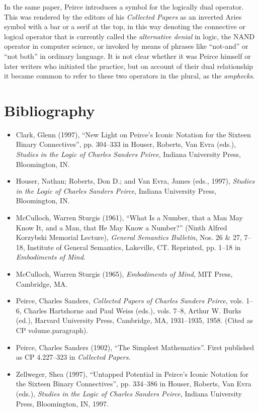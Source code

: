 \documentclass[12pt]{article}
\begin{document}
In the same paper, Peirce introduces a symbol for the logically dual operator.  This was rendered by the editors of his \textit{Collected Papers} as an inverted Aries symbol with a bar or a serif at the top, in this way denoting the connective or logical operator that is currently called the \textit{alternative denial} in logic, the NAND operator in computer science, or invoked by means of phrases like ``not-and'' or ``not both'' in ordinary language.  It is not clear whether it was Peirce himself or later writers who initiated the practice, but on account of their dual relationship it became common to refer to these two operators in the plural, as the \textit{amphecks}.

\section{Bibliography}

\begin{itemize}
\item
Clark, Glenn (1997), ``New Light on Peirce's Iconic Notation for the Sixteen Binary Connectives'', pp. 304--333 in Houser, Roberts, Van Evra (eds.), \textit{Studies in the Logic of Charles Sanders Peirce}, Indiana University Press, Bloomington, IN.
\item
Houser, Nathan; Roberts, Don D.; and Van Evra, James (eds., 1997), \textit{Studies in the Logic of Charles Sanders Peirce}, Indiana University Press, Bloomington, IN.
\item
McCulloch, Warren Sturgis (1961), ``What Is a Number, that a Man May Know It, and a Man, that He May Know a Number?'' (Ninth Alfred Korzybski Memorial Lecture), \textit{General Semantics Bulletin}, Nos. 26 \& 27, 7--18, Institute of General Semantics, Lakeville, CT.  Reprinted, pp. 1--18 in \textit{Embodiments of Mind}.
\item
McCulloch, Warren Sturgis (1965), \textit{Embodiments of Mind}, MIT Press, Cambridge, MA.
\item
Peirce, Charles Sanders, \textit{Collected Papers of Charles Sanders Peirce}, vols. 1--6, Charles Hartshorne and Paul Weiss (eds.), vols. 7--8, Arthur W. Burks (ed.), Harvard University Press, Cambridge, MA, 1931--1935, 1958.  (Cited as CP volume.paragraph).
\item
Peirce, Charles Sanders (1902), ``The Simplest Mathematics''.  First published as CP 4.227--323 in \textit{Collected Papers}.
\item
Zellweger, Shea (1997), ``Untapped Potential in Peirce's Iconic Notation for the Sixteen Binary Connectives'', pp. 334--386 in Houser, Roberts, Van Evra (eds.), \textit{Studies in the Logic of Charles Sanders Peirce}, Indiana University Press, Bloomington, IN, 
1997.
\end{itemize}

\end{document}

